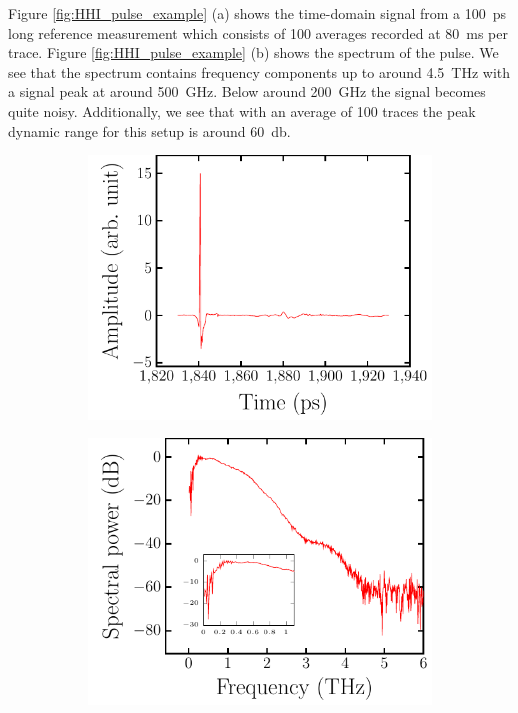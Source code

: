 Figure \ref{fig:HHI_pulse_example} (a) shows the time-domain signal from a \SI{100}{\pico \second} long reference measurement which consists of 100 averages recorded at \SI{80}{\milli \second} per trace. Figure \ref{fig:HHI_pulse_example} (b) shows the spectrum of the pulse. We see that the spectrum contains frequency components up to around \SI{4.5}{\tera \hertz} with a signal peak at around \SI{500}{\giga \hertz}. Below around \SI{200}{\giga \hertz} the signal becomes quite noisy. Additionally, we see that with an average of 100 traces the peak dynamic range for this setup is around \SI{60}{\decibel}.

\begin{figure}[H]
    \begin{subfigure}[b]{.5\linewidth}
    \caption{}\label{}
    \centering\includegraphics[scale=0.62]{images/setup/plots/pulse_example_a.pdf}
    \end{subfigure}%
    \begin{subfigure}[b]{.5\linewidth}
    \caption{}\label{}
    \centering\includegraphics[scale=0.62]{images/setup/plots/pulse_example_b.pdf}

\end{subfigure}
\end{figure}
